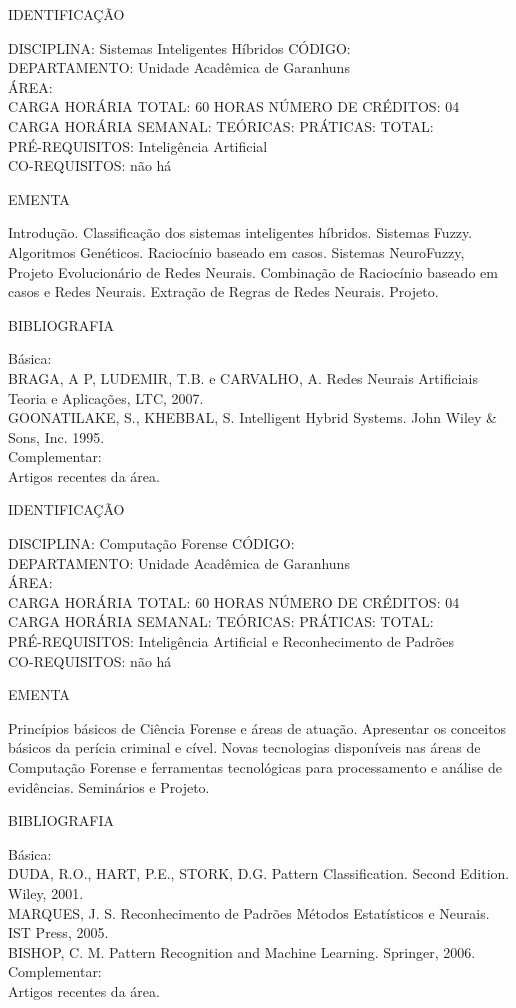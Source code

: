 \documentclass[
	12pt,				%
	openright,			%
  oneside,     %
	a4paper,			%
	chapter=TITLE,		%
	english,			%
	french,				%
	spanish,			%
	brazil				%
	]{abntex2}
\begin{document}
\begin{apendicesenv}
\newpage IDENTIFICAÇÃO

DISCIPLINA: Sistemas Inteligentes Híbridos CÓDIGO:\\ 
DEPARTAMENTO: Unidade Acadêmica de Garanhuns\\
ÁREA: \\
CARGA HORÁRIA TOTAL: 60 HORAS NÚMERO DE CRÉDITOS: 04\\
CARGA HORÁRIA SEMANAL: TEÓRICAS: PRÁTICAS: TOTAL: \\
PRÉ-REQUISITOS: Inteligência Artificial\\
CO-REQUISITOS: não há

EMENTA 

Introdução. Classificação dos sistemas inteligentes
híbridos. Sistemas Fuzzy. Algoritmos Genéticos. Raciocínio baseado em
casos. Sistemas NeuroFuzzy, Projeto Evolucionário de Redes Neurais.
Combinação de Raciocínio baseado em casos e Redes Neurais. Extração de
Regras de Redes Neurais. Projeto.

BIBLIOGRAFIA 

Básica:\\
BRAGA, A P, LUDEMIR, T.B. e CARVALHO, A. Redes Neurais Artificiais 
Teoria e Aplicações, LTC, 2007.\\
GOONATILAKE, S., KHEBBAL, S.  Intelligent Hybrid Systems. John Wiley
\& Sons, Inc. 1995.\\
Complementar:\\
Artigos recentes da área.

\newpage IDENTIFICAÇÃO

DISCIPLINA: Computação Forense CÓDIGO:\\ 
DEPARTAMENTO: Unidade Acadêmica de Garanhuns\\
ÁREA: \\
CARGA HORÁRIA TOTAL: 60 HORAS NÚMERO DE CRÉDITOS: 04\\
CARGA HORÁRIA SEMANAL: TEÓRICAS: PRÁTICAS: TOTAL: \\
PRÉ-REQUISITOS: Inteligência Artificial e Reconhecimento de Padrões\\
CO-REQUISITOS: não há

EMENTA 

Princípios básicos de Ciência Forense e áreas de atuação. Apresentar os
conceitos básicos da perícia criminal e cível. Novas tecnologias
disponíveis nas áreas de Computação Forense e ferramentas tecnológicas
para processamento e análise de evidências. Seminários e Projeto.

BIBLIOGRAFIA 

Básica:\\
DUDA, R.O., HART, P.E., STORK, D.G. Pattern Classification. Second
Edition. Wiley, 2001.\\MARQUES, J. S. Reconhecimento de Padrões  Métodos Estatísticos e
Neurais. IST Press, 2005.\\BISHOP, C. M. Pattern Recognition and Machine Learning. Springer, 2006.\\
Complementar:\\
Artigos recentes da área.


\end{apendicesenv}
\end{document}
